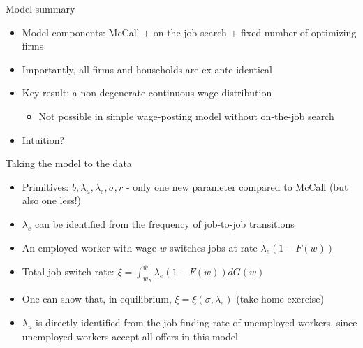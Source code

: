 \documentclass[9pt]{beamer}
\newcommand{\bit}{\begin{itemize}}
\newcommand{\eit}{\end{itemize}}
\newcommand{\bc}{\color{blue}}
\begin{document}
\begin{frame}{Model summary}

\bit
\setlength\itemsep{2em}

\item Model components: McCall + on-the-job search + fixed number of optimizing firms

\item Importantly, all firms and households are ex ante identical

\item Key result: a {\bc non-degenerate continuous wage distribution}
\bit 
	\item Not possible in simple wage-posting model without on-the-job search 
\eit

\item Intuition?


\eit


\end{frame}


\begin{frame}{Taking the model to the data}

\bit
\setlength\itemsep{2em}

\item Primitives: $b, \lambda_u, \lambda_e, \sigma, r$ - only one new parameter compared to McCall (but also one less!)

\item $\lambda_e$ can be identified from the frequency of job-to-job transitions

\item An employed worker with wage $w$ switches jobs at rate $\lambda_e(1-F(w))$

\item Total job switch rate: $ \xi = \int_{w_R}^{\bar w} \lambda_e (1-F(w)) d G(w)$


\item One can show that, in equilibrium, $\xi = \xi(\sigma, \lambda_e)$ (take-home exercise)


\item $\lambda_u$ is directly identified from the job-finding rate of unemployed workers, since unemployed workers accept all offers in this model


\eit


\end{frame}
\end{document}
